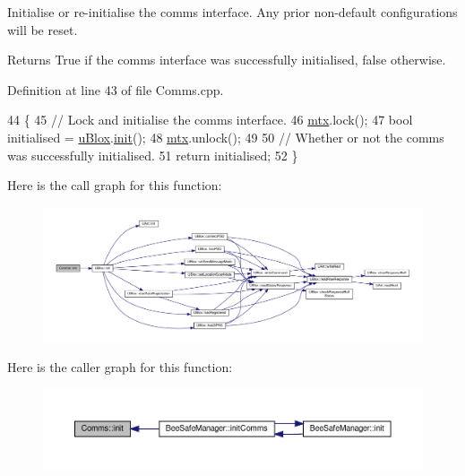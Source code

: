 Initialise or re-\/initialise the comms interface. Any prior non-\/default configurations will be reset.

\begin{DoxyReturn}{Returns}
True if the comms interface was successfully initialised, false otherwise. 
\end{DoxyReturn}


Definition at line 43 of file Comms.\+cpp.


\begin{DoxyCode}
44 \{
45     \textcolor{comment}{// Lock and initialise the comms interface.}
46     \hyperlink{class_comms_a21df861b1202573e4cd0cb5666d638fe}{mtx}.lock();
47     \textcolor{keywordtype}{bool} initialised = \hyperlink{class_comms_ac64dea134b116147e5441172346dbd6c}{uBlox}.\hyperlink{class_u_blox_a34c2f507ff3bbd21b9aea788a015527a}{init}();
48     \hyperlink{class_comms_a21df861b1202573e4cd0cb5666d638fe}{mtx}.unlock();
49 
50     \textcolor{comment}{// Whether or not the comms was successfully initialised.}
51     \textcolor{keywordflow}{return} initialised;
52 \}
\end{DoxyCode}
Here is the call graph for this function\+:\nopagebreak
\begin{figure}[H]
\begin{center}
\leavevmode
\includegraphics[width=350pt]{d8/dcc/class_comms_aa0519d3ed2d5bd6aad60101080ac2de7_cgraph}
\end{center}
\end{figure}
Here is the caller graph for this function\+:\nopagebreak
\begin{figure}[H]
\begin{center}
\leavevmode
\includegraphics[width=350pt]{d8/dcc/class_comms_aa0519d3ed2d5bd6aad60101080ac2de7_icgraph}
\end{center}
\end{figure}
\mbox{\label{class_comms_a30ab10ea604ab2b169ca66f3f1071c0e}} 
